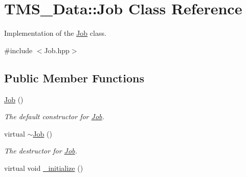 \hypertarget{classTMS__Data_1_1Job}{
\section{TMS\_\-Data::Job Class Reference}
\label{classTMS__Data_1_1Job}
}


Implementation of the \hyperlink{classTMS__Data_1_1Job}{Job} class.  




{\ttfamily \#include $<$Job.hpp$>$}

\subsection*{Public Member Functions}
\begin{DoxyCompactItemize}
\item 
\hypertarget{classTMS__Data_1_1Job_a6db4f6e1237edbef23c02a9d15273eb7}{
\hyperlink{classTMS__Data_1_1Job_a6db4f6e1237edbef23c02a9d15273eb7}{Job} ()}
\label{classTMS__Data_1_1Job_a6db4f6e1237edbef23c02a9d15273eb7}

\begin{DoxyCompactList}\small\item\em The default constructor for \hyperlink{classTMS__Data_1_1Job}{Job}. \item\end{DoxyCompactList}\item 
\hypertarget{classTMS__Data_1_1Job_abf498eead8facb25d5b9015e8d6fb03b}{
virtual \hyperlink{classTMS__Data_1_1Job_abf498eead8facb25d5b9015e8d6fb03b}{$\sim$Job} ()}
\label{classTMS__Data_1_1Job_abf498eead8facb25d5b9015e8d6fb03b}

\begin{DoxyCompactList}\small\item\em The destructor for \hyperlink{classTMS__Data_1_1Job}{Job}. \item\end{DoxyCompactList}\item 
\hypertarget{classTMS__Data_1_1Job_aa8d1ab309566348eab5689cbe21f159a}{
virtual void \hyperlink{classTMS__Data_1_1Job_aa8d1ab309566348eab5689cbe21f159a}{\_\-initialize} ()}
\label{classTMS__Data_1_1Job_aa8d1ab309566348eab5689cbe21f159a}


\end{DoxyCompactItemize}
